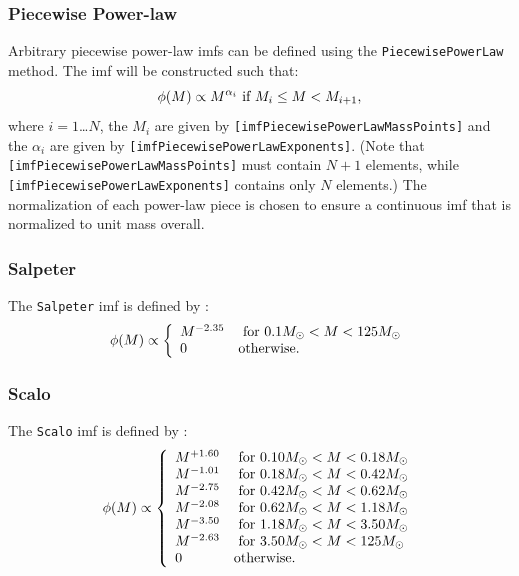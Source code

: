 \subsubsection{Piecewise Power-law}

Arbitrary piecewise power-law {\gls{imf}}s can be defined using the {\tt PiecewisePowerLaw} method. The \gls{imf} will be constructed such that:
\begin{equation}
 \phi(M) \propto M^{\alpha_i} \hbox{ if } M_i \le M < M_{i+1},
\end{equation}
where $i=1$\ldots$N$, the $M_i$ are given by {\tt [imfPiecewisePowerLawMassPoints]} and the $\alpha_i$ are given by {\tt [imfPiecewisePowerLawExponents]}. (Note that {\tt [imfPiecewisePowerLawMassPoints]} must contain $N+1$ elements, while {\tt [imfPiecewisePowerLawExponents]} contains only $N$ elements.) The normalization of each power-law piece is chosen to ensure a continuous \gls{imf} that is normalized to unit mass overall.

\subsubsection{Salpeter}

The {\tt Salpeter} \gls{imf} is defined by \citep{salpeter_luminosity_1955}:
\begin{equation}
 \phi(M) \propto \left\{ \begin{array}{ll} M^{-2.35} & \hbox{ for } 0.1M_\odot < M < 125M_\odot \\ 0 & \hbox {otherwise.} \end{array} \right.
\end{equation}

\subsubsection{Scalo}

The {\tt Scalo} \gls{imf} is defined by \citep{scalo_stellar_1986}:
\begin{equation}
 \phi(M) \propto \left\{ \begin{array}{ll}
 M^{+1.60} & \hbox{ for } 0.10M_\odot < M < 0.18M_\odot \\
 M^{-1.01} & \hbox{ for } 0.18M_\odot < M < 0.42M_\odot \\
 M^{-2.75} & \hbox{ for } 0.42M_\odot < M < 0.62M_\odot \\
 M^{-2.08} & \hbox{ for } 0.62M_\odot < M < 1.18M_\odot \\
 M^{-3.50} & \hbox{ for } 1.18M_\odot < M < 3.50M_\odot \\
 M^{-2.63} & \hbox{ for } 3.50M_\odot < M < 125M_\odot \\
 0 & \hbox {otherwise.} \end{array} \right.
\end{equation}

